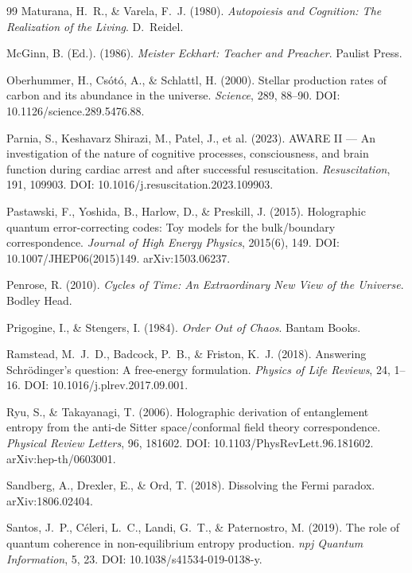\documentclass[12pt, a4paper]{article}
\begin{document}
\begin{thebibliography}{99}
Maturana, H.~R., \& Varela, F.~J. (1980). \textit{Autopoiesis and Cognition: The
Realization of the Living}. D.~Reidel.

McGinn, B. (Ed.). (1986). \textit{Meister Eckhart: Teacher and Preacher}. Paulist Press.

Oberhummer, H., Cs\'{o}t\'{o}, A., \& Schlattl, H. (2000). Stellar production rates of
carbon and its abundance in the universe. \textit{Science}, 289, 88--90.
DOI: 10.1126/science.289.5476.88.

Parnia, S., Keshavarz Shirazi, M., Patel, J., et al. (2023). AWARE II --- An investigation
of the nature of cognitive processes, consciousness, and brain function during cardiac arrest
and after successful resuscitation. \textit{Resuscitation}, 191, 109903.
DOI: 10.1016/j.resuscitation.2023.109903.

Pastawski, F., Yoshida, B., Harlow, D., \& Preskill, J. (2015). Holographic quantum
error-correcting codes: Toy models for the bulk/boundary correspondence.
\textit{Journal of High Energy Physics}, 2015(6), 149.
DOI: 10.1007/JHEP06(2015)149. arXiv:1503.06237.

Penrose, R. (2010). \textit{Cycles of Time: An Extraordinary New View of the Universe}.
Bodley Head.

Prigogine, I., \& Stengers, I. (1984). \textit{Order Out of Chaos}. Bantam Books.

Ramstead, M.~J.~D., Badcock, P.~B., \& Friston, K.~J. (2018). Answering Schr\"{o}dinger's
question: A free-energy formulation. \textit{Physics of Life Reviews}, 24, 1--16.
DOI: 10.1016/j.plrev.2017.09.001.

Ryu, S., \& Takayanagi, T. (2006). Holographic derivation of entanglement entropy from the
anti-de Sitter space/conformal field theory correspondence. \textit{Physical Review Letters},
96, 181602. DOI: 10.1103/PhysRevLett.96.181602. arXiv:hep-th/0603001.

Sandberg, A., Drexler, E., \& Ord, T. (2018). Dissolving the Fermi paradox. arXiv:1806.02404.

Santos, J.~P., C\'{e}leri, L.~C., Landi, G.~T., \& Paternostro, M. (2019). The role of
quantum coherence in non-equilibrium entropy production. \textit{npj Quantum Information},
5, 23. DOI: 10.1038/s41534-019-0138-y.


\end{thebibliography}
\end{document}

